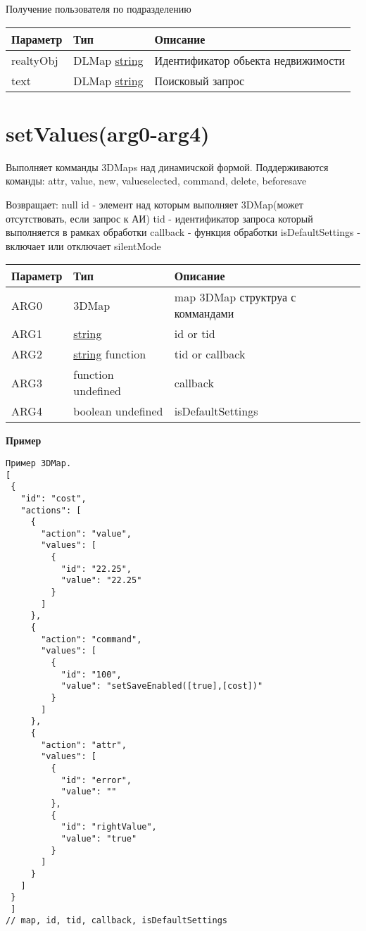 Получение пользователя по подразделению


\begin{longtable}[]{@{}lll@{}}
\toprule
Параметр & Тип & Описание\tabularnewline
\midrule
\endhead
realtyObj & DLMap \textbar{} \protect\hyperlink{string}{string} &
Идентификатор обьекта недвижимости\tabularnewline
text & DLMap \textbar{} \protect\hyperlink{string}{string} & Поисковый
запрос\tabularnewline
\bottomrule
\end{longtable}

\hypertarget{setvaluesarg0-arg1-arg2-arg3-arg4}{%
\section{setValues(arg0-arg4)}\label{setvaluesarg0-arg1-arg2-arg3-arg4}}

Выполняет комманды 3DMaps над динамичской формой. Поддерживаются
команды: attr, value, new, valueselected, command, delete, beforesave

Возвращает: null id - элемент над которым выполняет 3DMap(может
отсутствовать, если запрос к АИ) tid - идентификатор запроса который
выполняется в рамках обработки callback - функция обработки
isDefaultSettings - включает или отключает silentMode\\

\begin{longtable}[]{@{}lll@{}}
\toprule
Параметр & Тип & Описание\tabularnewline
\midrule
\endhead
ARG0 & 3DMap & map 3DMap структруа с коммандами\tabularnewline
ARG1 & \protect\hyperlink{string}{string} & id or tid\tabularnewline
ARG2 & \protect\hyperlink{string}{string} \textbar{} function & tid or
callback\tabularnewline
ARG3 & function \textbar{} undefined & callback\tabularnewline
ARG4 & boolean \textbar{} undefined & isDefaultSettings\tabularnewline
\bottomrule
\end{longtable}

\textbf{Пример}

\begin{verbatim}
Пример 3DMap.
[
 {
   "id": "cost",
   "actions": [
     {
       "action": "value",
       "values": [
         {
           "id": "22.25",
           "value": "22.25"
         }
       ]
     },
     {
       "action": "command",
       "values": [
         {
           "id": "100",
           "value": "setSaveEnabled([true],[cost])"
         }
       ]
     },
     {
       "action": "attr",
       "values": [
         {
           "id": "error",
           "value": ""
         },
         {
           "id": "rightValue",
           "value": "true"
         }
       ]
     }
   ]
 }
 ]
// map, id, tid, callback, isDefaultSettings
\end{verbatim}

